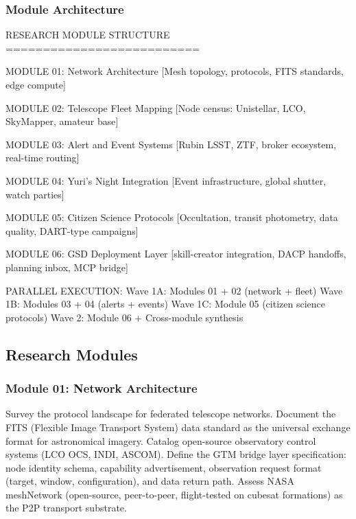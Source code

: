\documentclass[11pt,letterpaper]{article}
\begin{document}
\subsubsection{Module Architecture}

\begin{asciibox}
RESEARCH MODULE STRUCTURE
==========================

  MODULE 01: Network Architecture
  [Mesh topology, protocols, FITS standards, edge compute]

  MODULE 02: Telescope Fleet Mapping
  [Node census: Unistellar, LCO, SkyMapper, amateur base]

  MODULE 03: Alert and Event Systems
  [Rubin LSST, ZTF, broker ecosystem, real-time routing]

  MODULE 04: Yuri's Night Integration
  [Event infrastructure, global shutter, watch parties]

  MODULE 05: Citizen Science Protocols
  [Occultation, transit photometry, data quality, DART-type campaigns]

  MODULE 06: GSD Deployment Layer
  [skill-creator integration, DACP handoffs, planning inbox, MCP bridge]

  PARALLEL EXECUTION:
  Wave 1A: Modules 01 + 02 (network + fleet)
  Wave 1B: Modules 03 + 04 (alerts + events)
  Wave 1C: Module 05 (citizen science protocols)
  Wave 2:  Module 06 + Cross-module synthesis
\end{asciibox}

\subsection{Research Modules}

\subsubsection{Module 01: Network Architecture}

Survey the protocol landscape for federated telescope networks. Document the FITS (Flexible Image Transport System) data standard as the universal exchange format for astronomical imagery. Catalog open-source observatory control systems (LCO OCS, INDI, ASCOM). Define the GTM bridge layer specification: node identity schema, capability advertisement, observation request format (target, window, configuration), and data return path. Assess NASA meshNetwork (open-source, peer-to-peer, flight-tested on cubesat formations) as the P2P transport substrate.
\end{document}
